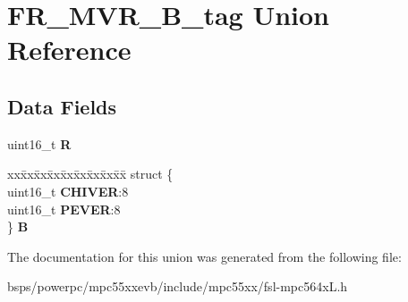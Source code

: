 \hypertarget{unionFR__MVR__16B__tag}{}\section{F\+R\+\_\+\+M\+V\+R\+\_\+B\+\_\+tag Union Reference}
\label{unionFR__MVR__16B__tag}
\subsection*{Data Fields}
\begin{DoxyCompactItemize}
\item 
\mbox{\label{unionFR__MVR__16B__tag_a66bb97fd6a22365ed6fba6912b201147}} 
uint16\+\_\+t {\bfseries R}
\item 
\mbox{\label{unionFR__MVR__16B__tag_a98fd18b84845e1b66a0494e3321876a4}} 
\begin{tabbing}
xx\=xx\=xx\=xx\=xx\=xx\=xx\=xx\=xx\=\kill
struct \{\\
\>uint16\_t {\bfseries CHIVER}:8\\
\>uint16\_t {\bfseries PEVER}:8\\
\} {\bfseries B}\\

\end{tabbing}\end{DoxyCompactItemize}


The documentation for this union was generated from the following file\+:\begin{DoxyCompactItemize}
\item 
bsps/powerpc/mpc55xxevb/include/mpc55xx/fsl-\/mpc564x\+L.\+h\end{DoxyCompactItemize}
